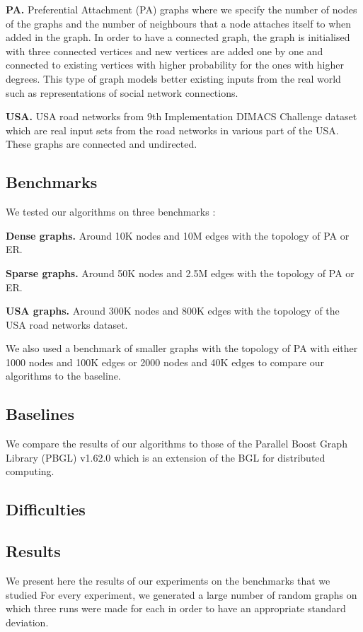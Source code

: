 \documentclass[letterpaper]{article}
\newcommand{\mypar}[1]{{\bf #1.}}
\begin{document}
\mypar{PA} Preferential Attachment (PA) graphs where we specify the number of nodes of the graphs and the number of neighbours that a node attaches itself to when added in the graph. In order to have a connected graph, the graph is initialised with three connected vertices and new vertices are added one by one and connected to existing vertices with higher probability for the ones with higher degrees. This type of graph models better existing inputs from the real world such as representations of social network connections.  

\mypar{USA} USA road networks from 9th Implementation DIMACS Challenge dataset which are real input sets from the road networks in various part of the USA. These graphs are connected and undirected.

\subsection{Benchmarks}

We tested our algorithms on three benchmarks :

\mypar{Dense graphs} Around 10K nodes and 10M edges with the topology of PA or ER.

\mypar{Sparse graphs} Around 50K nodes and 2.5M edges with the topology of PA or ER.

\mypar{USA graphs} Around 300K nodes and 800K edges with the topology of the USA road networks dataset.


We also used a benchmark of smaller graphs with the topology of PA with either 1000 nodes and 100K edges or 2000 nodes and 40K edges to compare our algorithms to the baseline.

\subsection{Baselines} \label{sec:baseline}

We compare the results of our algorithms to those of the Parallel Boost Graph Library (PBGL) v1.62.0 which is an extension of the BGL for distributed computing.

\subsection{Difficulties}

\subsection{Results} We present here the results of our experiments on the benchmarks that we studied For every experiment, we generated a large number of random graphs on which three runs were made for each in order to have an appropriate standard deviation.
\end{document}
